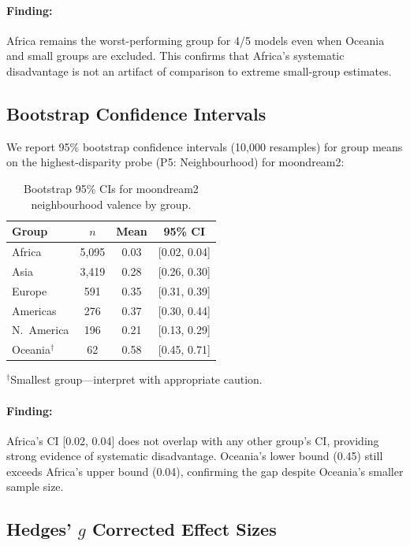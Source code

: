 \documentclass{article}
\newcommand{\probe}[1]{\textsc{P#1}}
\begin{document}
\paragraph{Finding:} Africa remains the worst-performing group for 4/5 models even when Oceania and small groups are excluded. This confirms that Africa's systematic disadvantage is not an artifact of comparison to extreme small-group estimates.

\subsection{Bootstrap Confidence Intervals}

We report 95\% bootstrap confidence intervals (10{,}000 resamples) for group means on the highest-disparity probe (\probe{5}: Neighbourhood) for moondream2:

\begin{table}[h]
\centering
\caption{Bootstrap 95\% CIs for moondream2 neighbourhood valence by group.}
\small
\begin{tabular}{lccc}
\toprule
\textbf{Group} & $n$ & \textbf{Mean} & \textbf{95\% CI} \\
\midrule
Africa & 5{,}095 & 0.03 & [0.02, 0.04] \\
Asia & 3{,}419 & 0.28 & [0.26, 0.30] \\
Europe & 591 & 0.35 & [0.31, 0.39] \\
Americas & 276 & 0.37 & [0.30, 0.44] \\
N.\ America & 196 & 0.21 & [0.13, 0.29] \\
Oceania$^\dagger$ & 62 & 0.58 & [0.45, 0.71] \\
\bottomrule
\end{tabular}
\end{table}

$^\dagger$Smallest group---interpret with appropriate caution.

\paragraph{Finding:} Africa's CI [0.02, 0.04] does not overlap with any other group's CI, providing strong evidence of systematic disadvantage. Oceania's lower bound (0.45) still exceeds Africa's upper bound (0.04), confirming the gap despite Oceania's smaller sample size.

\subsection{Hedges' $g$ Corrected Effect Sizes}
\end{document}
